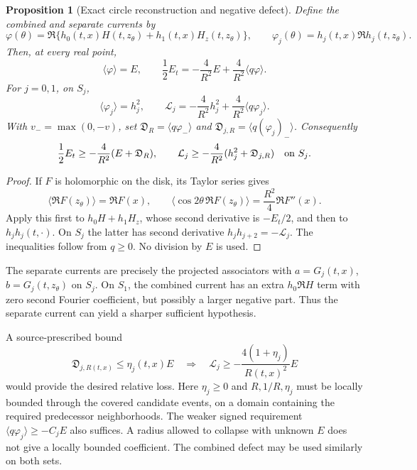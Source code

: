 \documentclass[11pt]{article}
\numberwithin{equation}{section}
\newtheorem{proposition}[theorem]{Proposition}
\theoremstyle{definition}
\theoremstyle{remark}
\newcommand{\Lag}{\mathcal L}
\begin{document}
\begin{proposition}[Exact circle reconstruction and negative defect]
\label{sf:boundary}
Define the combined and separate currents by
\[
 \varphi(\theta)=
 \Re\{h_0(t,x)H(t,z_\theta)+h_1(t,x)H_z(t,z_\theta)\},\qquad
 \varphi_j(\theta)=h_j(t,x)\Re h_j(t,z_\theta).
\]
Then, at every real point,
\begin{equation}
 \langle\varphi\rangle=E,\qquad
 \frac12E_t=-\frac4{R^2}E+\frac4{R^2}\langle q\varphi\rangle .
 \label{sf:combined-circle}
\end{equation}
For \(j=0,1\), on \(S_j\),
\begin{equation}
 \langle\varphi_j\rangle=h_j^2,\qquad
 \Lag_j=-\frac4{R^2}h_j^2+
                      \frac4{R^2}\langle q\varphi_j\rangle .
 \label{sf:stationary-circle}
\end{equation}
With \(v_-=\max(0,-v)\), set
\(\mathfrak D_R=\langle q\varphi_-\rangle\) and
\(\mathfrak D_{j,R}=\langle q(\varphi_j)_-\rangle\).  Consequently
\begin{equation}
 \frac12E_t\ge-\frac4{R^2}(E+\mathfrak D_R),\qquad
 \Lag_j\ge-\frac4{R^2}(h_j^2+\mathfrak D_{j,R})
                  \quad\hbox{on }S_j.
 \label{sf:boundary-defect}
\end{equation}
\end{proposition}
\begin{proof}
If \(F\) is holomorphic on the disk, its Taylor series gives
\[
 \langle\Re F(z_\theta)\rangle=\Re F(x),\qquad
 \langle\cos2\theta\,\Re F(z_\theta)\rangle
                         =\frac{R^2}{4}\Re F''(x).
\]
Apply this first to \(h_0H+h_1H_z\), whose second derivative is
\(-E_t/2\), and then to \(h_jh_j(t,\cdot)\).  On \(S_j\) the latter
has second derivative \(h_jh_{j+2}=-\Lag_j\).  The inequalities follow
from \(q\ge0\).  No division by \(E\) is used.
\end{proof}

The separate currents are precisely the projected associators with
\(a=G_j(t,x)\), \(b=G_j(t,z_\theta)\) on \(S_j\).  On \(S_1\), the
combined current has an extra \(h_0\Re H\) term with zero second Fourier
coefficient, but possibly a larger negative part.  Thus the separate
current can yield a sharper sufficient hypothesis.

A source-prescribed bound
\begin{equation}
 \mathfrak D_{j,R(t,x)}\le\eta_j(t,x)E
 \quad\Longrightarrow\quad
 \Lag_j\ge-\frac{4(1+\eta_j)}{R(t,x)^2}E
 \label{sf:defect-target}
\end{equation}
would provide the desired relative loss.  Here \(\eta_j\ge0\) and
\(R,1/R,\eta_j\) must be locally bounded through the covered candidate
events, on a domain containing the required predecessor neighborhoods.
The weaker signed requirement
\(\langle q\varphi_j\rangle\ge-C_jE\) also suffices.  A radius allowed
to collapse with unknown \(E\) does not give a locally bounded
coefficient.  The combined defect may be used similarly on both sets.
\end{document}

